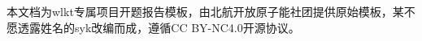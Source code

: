 
\begin{cabstract}
本文档为wlkt专属项目开题报告模板，由北航开放原子能社团提供原始模板，某不愿透露姓名的syk改编而成，遵循CC BY-NC4.0开源协议。
\end{cabstract}

